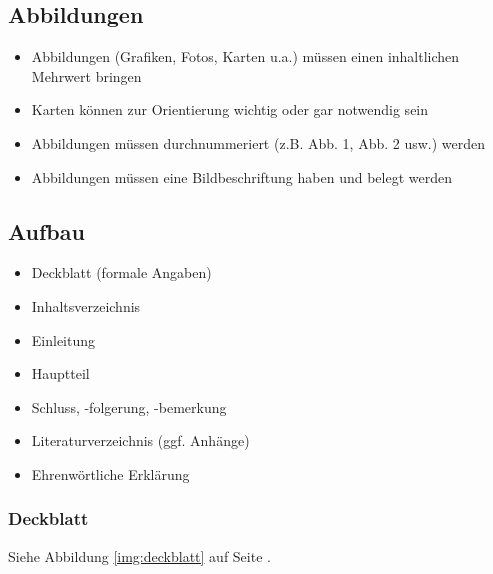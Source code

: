 \documentclass[ 12pt,
                titlepage,
                parskip=half,
                version=first,
                bibliography=totocnumbered,
                final,
                listof=totoc]{scrartcl}
\begin{document}
\subsection{Abbildungen}

\begin{itemize}
    \item Abbildungen (Grafiken, Fotos, Karten u.a.) müssen einen inhaltlichen
    Mehrwert bringen
    \item Karten können zur Orientierung wichtig oder gar notwendig sein
    \item Abbildungen müssen durchnummeriert (z.B. Abb. 1, Abb. 2 usw.) werden
    \item Abbildungen müssen eine Bildbeschriftung haben und belegt werden
\end{itemize}

\subsection{Aufbau}

\begin{itemize}
    \item Deckblatt (formale Angaben)
    \item Inhaltsverzeichnis
    \item Einleitung
    \item Hauptteil
    \item Schluss, -folgerung, -bemerkung
    \item Literaturverzeichnis (ggf. Anhänge)
    \item Ehrenwörtliche Erklärung
\end{itemize}

\subsubsection{Deckblatt}

Siehe Abbildung \ref{img:deckblatt} auf Seite \pageref{img:deckblatt}.
\end{document}

